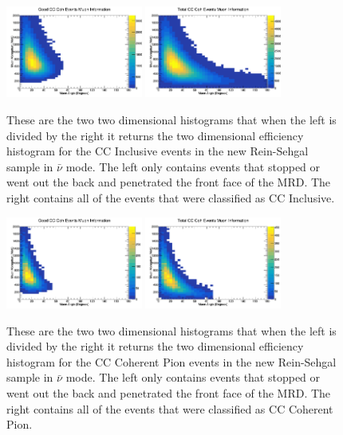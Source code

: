 \documentclass[11pt]{article}
\begin{document}
\begin{figure}[H]
\centering
\includegraphics[width=0.4\textwidth]{NewANMReinSehgalImages/6-GoodCCCohMuonInfoANMRS.png}
\includegraphics[width=0.4\textwidth]{NewANMReinSehgalImages/9-TotalCCCohMuonInfoANMRS.png}
\caption{These are the two two dimensional histograms that when the left is divided by the right it returns the two dimensional efficiency histogram for the CC Inclusive events in the new Rein-Sehgal sample in $\bar{\nu}$ mode. The left only contains events that stopped or went out the back and penetrated the front face of the MRD. The right contains all of the events that were classified as CC Inclusive.}
\end{figure}

\begin{figure}[H]
\centering
\includegraphics[width=0.4\textwidth]{NewANMReinSehgalImages/7.png}
\includegraphics[width=0.4\textwidth]{NewANMReinSehgalImages/8.png}
\caption{These are the two two dimensional histograms that when the left is divided by the right it returns the two dimensional efficiency histogram for the CC Coherent Pion events in the new Rein-Sehgal sample in $\bar{\nu}$ mode. The left only contains events that stopped or went out the back and penetrated the front face of the MRD. The right contains all of the events that were classified as CC Coherent Pion.}
\end{figure}
\end{document}
